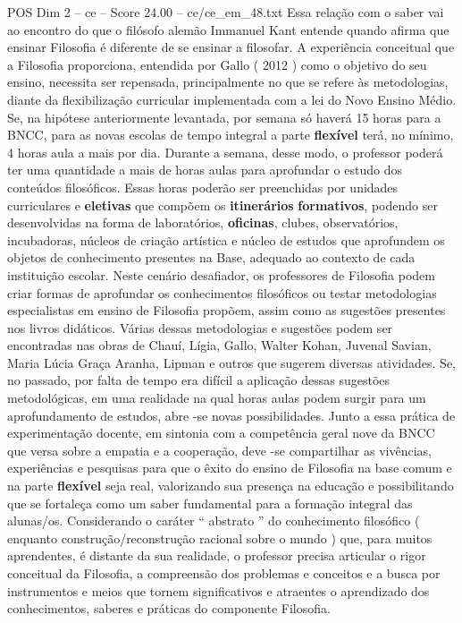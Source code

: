 \begin{textsample}{POS Dim 2 – ce – Score 24.00 – ce/ce\_em\_48.txt}
Essa relação com o saber vai ao encontro do que o filósofo alemão Immanuel Kant entende quando afirma que ensinar Filosofia é diferente de se ensinar a filosofar.
A experiência conceitual que a Filosofia proporciona, entendida por Gallo ( 2012 ) como o objetivo do seu ensino, necessita ser repensada, principalmente no que se refere às metodologias, diante da flexibilização curricular implementada com a lei do Novo Ensino Médio.
Se, na hipótese anteriormente levantada, por semana só haverá 15 horas para a BNCC, para as novas escolas de tempo integral a parte \textbf{flexível} terá, no mínimo, 4 horas aula a mais por dia.
Durante a semana, desse modo, o professor poderá ter uma quantidade a mais de horas aulas para aprofundar o estudo dos conteúdos filosóficos.
Essas horas poderão ser preenchidas por unidades curriculares e \textbf{eletivas} que compõem os \textbf{itinerários} \textbf{formativos}, podendo ser desenvolvidas na forma de laboratórios, \textbf{oficinas}, clubes, observatórios, incubadoras, núcleos de criação artística e núcleo de estudos que aprofundem os objetos de conhecimento presentes na Base, adequado ao contexto de cada instituição escolar.
Neste cenário desafiador, os professores de Filosofia podem criar formas de aprofundar os conhecimentos filosóficos ou testar metodologias especialistas em ensino de Filosofia propõem, assim como as sugestões presentes nos livros didáticos.
Várias dessas metodologias e sugestões podem ser encontradas nas obras de Chauí, Lígia, Gallo, Walter Kohan, Juvenal Savian, Maria Lúcia Graça Aranha, Lipman e outros que sugerem diversas atividades.
Se, no passado, por falta de tempo era difícil a aplicação dessas sugestões metodológicas, em uma realidade na qual horas aulas podem surgir para um aprofundamento de estudos, abre -se novas possibilidades.
Junto a essa prática de experimentação docente, em sintonia com a competência geral nove da BNCC que versa sobre a empatia e a cooperação, deve -se compartilhar as vivências, experiências e pesquisas para que o êxito do ensino de Filosofia na base comum e na parte \textbf{flexível} seja real, valorizando sua presença na educação e possibilitando que se fortaleça como um saber fundamental para a formação integral das alunas/os.
Considerando o caráter “ abstrato ” do conhecimento filosófico ( enquanto construção/reconstrução racional sobre o mundo ) que, para muitos aprendentes, é distante da sua realidade, o professor precisa articular o rigor conceitual da Filosofia, a compreensão dos problemas e conceitos e a busca por instrumentos e meios que tornem significativos e atraentes o aprendizado dos conhecimentos, saberes e práticas do componente Filosofia.

\end{textsample}
